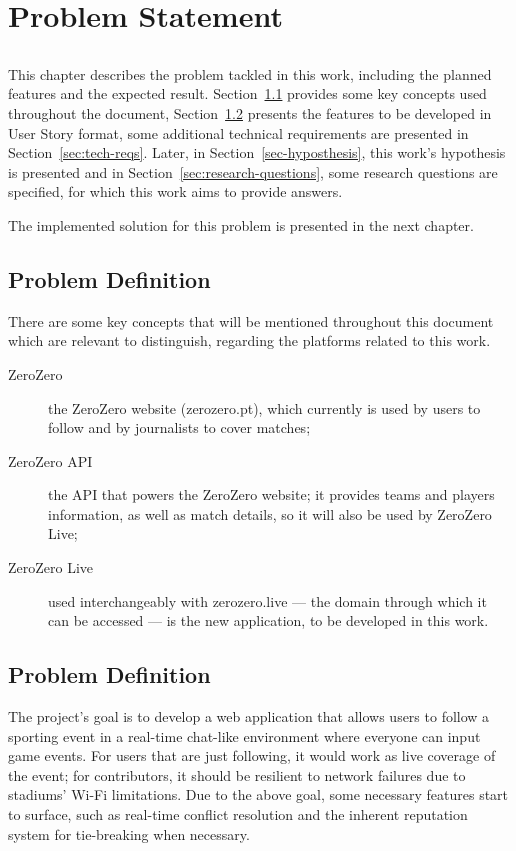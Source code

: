 \chapter{Problem Statement}\label{chap:problem}

\section*{}

This chapter describes the problem tackled in this work, including the planned features and the expected result. Section~\ref{sec:key-concepts} provides some key concepts used throughout the document, Section~\ref{sec:prob-def} presents the features to be developed in User Story format, some additional technical requirements are presented in Section~\ref{sec:tech-reqs}. Later, in Section~\ref{sec-hyposthesis}, this work's hypothesis is presented and in Section~\ref{sec:research-questions}, some research questions are specified, for which this work aims to provide answers.

The implemented solution for this problem is presented in the next chapter.  

\section{Problem Definition}\label{sec:key-concepts}
There are some key concepts that will be mentioned throughout this document which are relevant to distinguish, regarding the platforms related to this work.
\begin{description}
    \item[ZeroZero] the ZeroZero website (zerozero.pt), which currently is used by users to follow and by journalists to cover matches;
    \item[ZeroZero API] the API that powers the ZeroZero website; it provides teams and players information, as well as match details, so it will also be used by ZeroZero Live;
    \item[ZeroZero Live] used interchangeably with zerozero.live --- the domain through which it can be accessed --- is the new application, to be developed in this work.
\end{description}

\section{Problem Definition}\label{sec:prob-def}

The project's goal is to develop a web application that allows users to follow a sporting event in a real-time chat-like environment where everyone can input game events. For users that are just following, it would work as live coverage of the event; for contributors, it should be resilient to network failures due to stadiums' Wi-Fi limitations.
Due to the above goal, some necessary features start to surface, such as real-time conflict resolution and the inherent reputation system for tie-breaking when necessary. 

